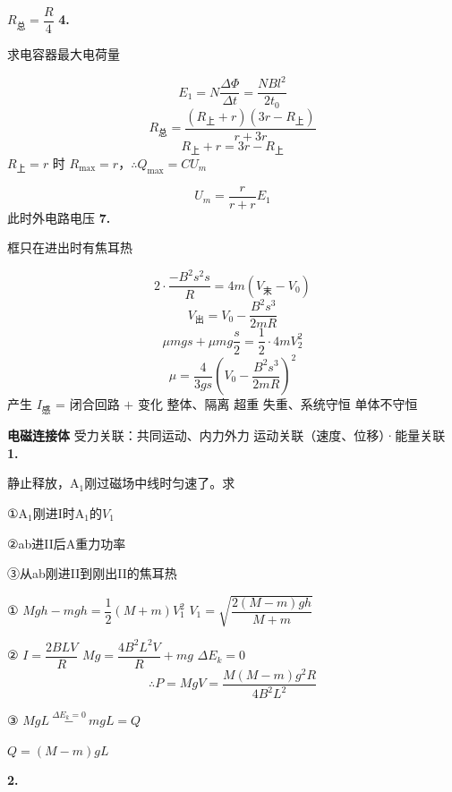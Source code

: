 
$R_{\text{总}}=\dfrac{R}{4}$
\textbf{4.}

求电容器最大电荷量

\[ E_1=N\frac{\Delta\Phi}{\Delta t}=\frac{NBl^{2}}{2t_0} \]
\[ R_{\text{总}}=\frac{(R_{\text{上}}+r)(3r-R_{\text{上}})}{r+3r} \]
\[ R_{\text{上}}+r=3r-R_{\text{上}} \]
$R_{\text{上}}=r$ 时 $R_{\max}=r$，$\therefore Q_{\max}=CU_m$

\[ U_m=\frac{r}{r+r}E_1 \]
此时外电路电压  %
\textbf{7.}

 \hfill 框只在进出时有焦耳热

\[ 2\cdot\frac{-B^{2}s^{2}s}{R}=4m(V_{\text{末}}-V_0) \] %
\[ V_{\text{出}}=V_0-\frac{B^{2}s^{3}}{2mR} \]
\[ \mu mgs+\mu mg\frac{s}{2}=\frac12\cdot 4mV_2^{2} \]
 \quad {}
\[ \mu=\frac{4}{3gs}\left(V_0-\frac{B^{2}s^{3}}{2mR}\right)^{2} \]
产生 $I_{\text{感}}$ = 闭合回路 $+$ 变化 %
整体、隔离 \quad 超重 失重、系统守恒 \quad 单体不守恒

\textbf{电磁连接体} \quad 受力关联：共同运动、内力外力 \quad 运动关联（速度、位移）·能量关联
\textbf{1.}

\begin{problem}
静止释放，A$_1$刚过磁场中线时匀速了。求

①A$_1$刚进I时A$_1$的$V_1$

②ab进II后A重力功率

③从ab刚进II到刚出II的焦耳热
\begin{solution}
① $Mgh-mgh=\dfrac12(M+m)V_1^{2}$ \qquad $V_1=\sqrt{\dfrac{2(M-m)gh}{M+m}}$

②  \quad $I=\dfrac{2BLV}{R}$ \qquad $Mg=\dfrac{4B^{2}L^{2}V}{R}+mg$ \qquad $\Delta E_k=0$ 
\[ \therefore P=MgV=\frac{M(M-m)g^{2}R}{4B^{2}L^{2}} \]

③ $MgL\ \overset{\Delta E_k=0}{-}\ mgL=Q$

$Q=(M-m)gL$
\end{solution}
\end{problem}
\textbf{2.}

